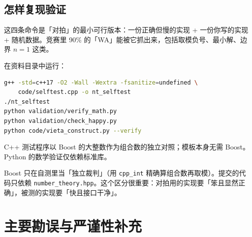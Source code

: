 \documentclass[UTF8,a4paper,11pt,twoside,openright,fontset=fandol]{ctexbook}
\theoremstyle{definition}
\begin{document}
\section{怎样复现验证}

\begin{tip}
这四条命令是「对拍」的最小可行版本：一份正确但慢的实现 + 一份你写的实现 + 随机数据。竞赛里 90\% 的「WA」能被它抓出来，包括取模负号、最小解、边界 $n=1$ 这类。
\end{tip}

在资料目录中运行：
\begin{lstlisting}[language=bash]
g++ -std=c++17 -O2 -Wall -Wextra -fsanitize=undefined \
    code/selftest.cpp -o nt_selftest
./nt_selftest
python validation/verify_math.py
python validation/check_happy.py
python code/vieta_construct.py --verify
\end{lstlisting}
C++ 测试程序以 Boost 的大整数作为组合数的独立对照；模板本身无需 Boost。Python 的数学验证仅依赖标准库。

\begin{tip}
Boost 只在自测里当「独立裁判」（用 \texttt{cpp\_int} 精确算组合数再取模）。提交的代码只依赖 \texttt{number\_theory.hpp}。这个区分很重要：对拍用的实现要「笨且显然正确」，被测的实现要「快且接口干净」。
\end{tip}


\clearpage
\setcounter{page}{1}
\chapter{主要勘误与严谨性补充}
\end{document}
